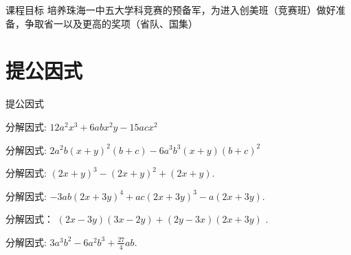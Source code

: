 \documentclass[aspectratio=169]{ctexbeamer}
\theoremstyle{definition}
\begin{document}
\begin{frame}{课程目标}
	培养珠海一中五大学科竞赛的预备军，为进入创美班（竞赛班）做好准备，争取省一以及更高的奖项（省队、国集）
\end{frame}

\section{提公因式}
\begin{frame}[t]{提公因式}
	\begin{example}[一次提净]\label{ex:提公因式-例1-一次提净}
		分解因式: $12 a^{2} x^{3}+6 a b x^{2} y-15 a c x^{2}$
	\end{example}
\end{frame}

\begin{frame}[t]
	\begin{example}[视“多”为一]\label{ex:提公因式-例2-一次提净}
		分解因式: $2 a^{2} b(x+y)^{2}(b+c)-6 a^{3} b^{3}(x+y)(b+c)^{2}$
	\end{example}
\end{frame}

\begin{frame}[t]
	\begin{example}[切勿漏 1]
		分解因式: $(2 x+y)^{3}-(2 x+y)^{2}+(2 x+y)$.
	\end{example}
\end{frame}

\begin{frame}[t]
	\begin{example}[注意符号]\label{ex:提公因式-例4-注意符号}
		分解因式: $-3 a b(2 x+3 y)^{4}+a c(2 x+3 y)^{3}-a(2 x+3 y)$.
	\end{example}
\end{frame}

\begin{frame}[t]
	\begin{example}[仔细观察]\label{ex:提公因式-例5-仔细观察}
		分解因式： $(2 x-3 y)(3 x-2 y)+(2 y-3 x)(2 x+3 y)$ .
	\end{example}
\end{frame}

\begin{frame}[t]
	\begin{example}[化“分”为整]\label{ex:提公因式-例6-化分为整}
		分解因式: $3 a^{3} b^{2}-6 a^{2} b^{3}+\frac{27}{4} a b$.
	\end{example}
\end{frame}
\end{document}
